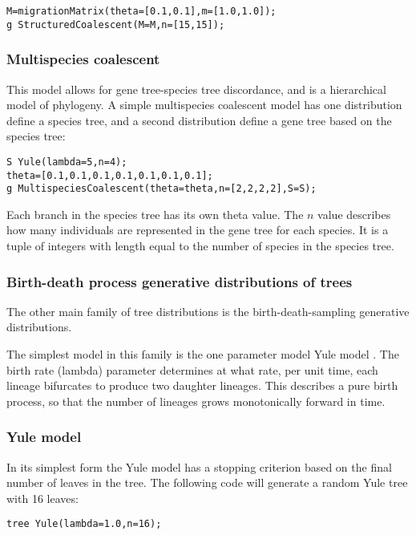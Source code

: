 \documentclass[10pt,letterpaper,table]{article}
\begin{document}
{\begin{alltt}
  M = migrationMatrix(theta=[0.1, 0.1], m=[1.0, 1.0]);
  g ~ StructuredCoalescent(M=M, n=[15, 15]);
\end{alltt}

\subsubsection*{Multispecies coalescent}

This model allows for gene tree-species tree discordance, and is a
hierarchical model of phylogeny.
A simple multispecies coalescent model has one distribution define a
species tree, and a second distribution define a gene tree based on
the species tree:

\begin{alltt}
  S ~ Yule(lambda=5, n=4);
  theta = [0.1, 0.1, 0.1, 0.1, 0.1, 0.1, 0.1];
  g ~ MultispeciesCoalescent(theta=theta, n=[2, 2, 2, 2], S=S);
\end{alltt}

Each branch in the species tree has its own theta value.
The $n$ value describes how many individuals are represented in
the gene tree for each species.
It is a tuple of integers with length equal to the number of species
in the species tree.

\subsubsection*{Birth-death process generative distributions of trees}

The other main family of tree distributions is the birth-death-sampling generative distributions.

The simplest model in this family is the one parameter model Yule model \cite{yule1925ii}.
The birth rate (lambda) parameter determines at what rate, per unit time, each lineage bifurcates to produce two daughter lineages.
This describes a pure birth process, so that the number of lineages grows monotonically forward in time.

\subsubsection*{Yule model}

In its simplest form the Yule model has a stopping criterion based on the final number of leaves in the tree.
The following code will generate a random Yule tree with 16 leaves:

\begin{alltt}
  tree ~ Yule(lambda=1.0, n=16);
\end{alltt}

}
\end{document}
